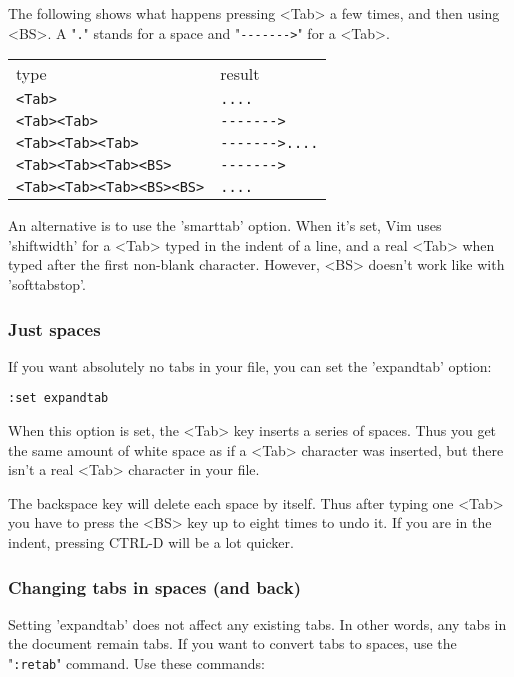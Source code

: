 The following shows what happens pressing <Tab> a few times, and then using <BS>.
A "\verb!.!" stands for a space and "\verb!------->!" for a <Tab>.

\begin{center} \begin{tabular}{l l}
type & result \\ 
\verb!<Tab>! & \verb!....! \\
\verb!<Tab><Tab>! & \verb!------->! \\
\verb!<Tab><Tab><Tab>! & \verb!------->....! \\
\verb!<Tab><Tab><Tab><BS>! & \verb!------->! \\
\verb!<Tab><Tab><Tab><BS><BS>! & \verb!....! \\		
\end{tabular} \end{center}

An alternative is to use the 'smarttab' option.
When it's set, Vim uses 'shiftwidth' for a <Tab> typed in the indent of a line, and a real <Tab> when typed after the first non-blank character.
However, <BS> doesn't work like with 'softtabstop'.

\subsubsection{Just spaces}
If you want absolutely no tabs in your file, you can set the 'expandtab' option:

\begin{Verbatim}[samepage=true]
 :set expandtab
\end{Verbatim}

When this option is set, the <Tab> key inserts a series of spaces.
Thus you get the same amount of white space as if a <Tab> character was inserted, but there isn't a real <Tab> character in your file.

The backspace key will delete each space by itself.
Thus after typing one <Tab> you have to press the <BS> key up to eight times to undo it.
If you are in the indent, pressing CTRL-D will be a lot quicker.

\subsubsection{Changing tabs in spaces (and back)}
Setting 'expandtab' does not affect any existing tabs.
In other words, any tabs in the document remain tabs.
If you want to convert tabs to spaces, use the "\verb!:retab!" command.
Use these commands:

